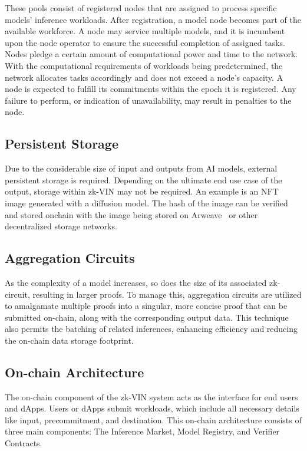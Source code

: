 \documentclass[conference]{IEEEtran}
\begin{document}
These pools consist of registered nodes that are assigned to process specific models' inference workloads. After registration, a model node becomes part of the available workforce. A node may service multiple models, and it is incumbent upon the node operator to ensure the successful completion of assigned tasks. Nodes pledge a certain amount of computational power and time to the network. With the computational requirements of workloads being predetermined, the network allocates tasks accordingly and does not exceed a node's capacity. A node is expected to fulfill its commitments within the epoch it is registered. Any failure to perform, or indication of unavailability, may result in penalties to the node.


\subsection{Persistent Storage}

Due to the considerable size of input and outputs from AI models, external persistent storage is required. Depending on the ultimate end use case of the output, storage within zk-VIN may not be required. An example is an NFT image generated with a diffusion model. The hash of the image can be verified and stored onchain with the image being stored on Arweave~\cite{Arweave} or other decentralized storage networks.


\subsection{Aggregation Circuits}

As the complexity of a model increases, so does the size of its associated zk-circuit, resulting in larger proofs. To manage this, aggregation circuits are utilized to amalgamate multiple proofs into a singular, more concise proof that can be submitted on-chain, along with the corresponding output data. This technique also permits the batching of related inferences, enhancing efficiency and reducing the on-chain data storage footprint.

\subsection{On-chain Architecture}

The on-chain component of the zk-VIN system acts as the interface for end users and dApps.  Users or dApps submit workloads, which include all necessary details like input, precommitment, and destination. This on-chain architecture consists of three main components: The Inference Market, Model Registry, and Verifier Contracts.
\end{document}
